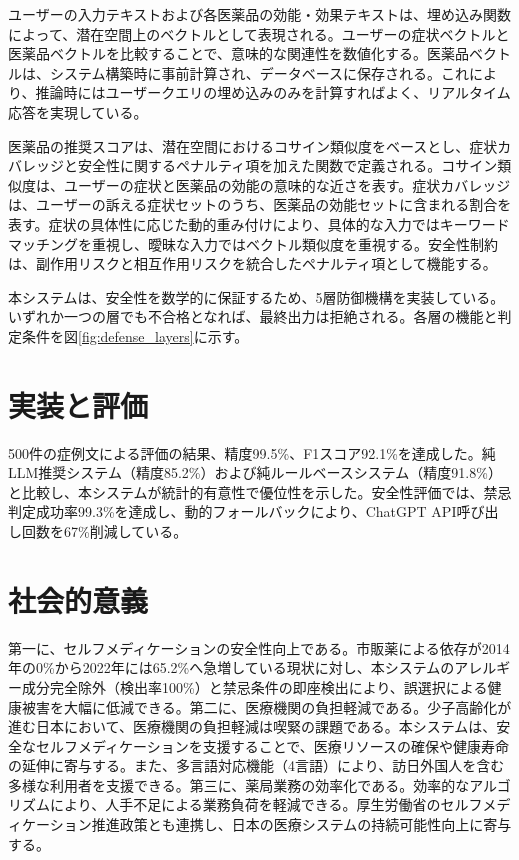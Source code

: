\documentclass[a4paper,11pt]{bxjsarticle}
\theoremstyle{definition}
\begin{document}
ユーザーの入力テキストおよび各医薬品の効能・効果テキストは、埋め込み関数によって、潜在空間上のベクトルとして表現される。ユーザーの症状ベクトルと医薬品ベクトルを比較することで、意味的な関連性を数値化する。医薬品ベクトルは、システム構築時に事前計算され、データベースに保存される。これにより、推論時にはユーザークエリの埋め込みのみを計算すればよく、リアルタイム応答を実現している。

医薬品の推奨スコアは、潜在空間におけるコサイン類似度をベースとし、症状カバレッジと安全性に関するペナルティ項を加えた関数で定義される。コサイン類似度は、ユーザーの症状と医薬品の効能の意味的な近さを表す。症状カバレッジは、ユーザーの訴える症状セットのうち、医薬品の効能セットに含まれる割合を表す。症状の具体性に応じた動的重み付けにより、具体的な入力ではキーワードマッチングを重視し、曖昧な入力ではベクトル類似度を重視する。安全性制約は、副作用リスクと相互作用リスクを統合したペナルティ項として機能する。

本システムは、安全性を数学的に保証するため、5層防御機構を実装している。いずれか一つの層でも不合格となれば、最終出力は拒絶される。各層の機能と判定条件を図\ref{fig:defense_layers}に示す。

\section{実装と評価}

500件の症例文による評価の結果、精度99.5\%、F1スコア92.1\%を達成した。純LLM推奨システム（精度85.2\%）および純ルールベースシステム（精度91.8\%）と比較し、本システムが統計的有意性で優位性を示した。安全性評価では、禁忌判定成功率99.3\%を達成し、動的フォールバックにより、ChatGPT API呼び出し回数を67\%削減している。


\section{社会的意義}

第一に、セルフメディケーションの安全性向上である。市販薬による依存が2014年の0\%から2022年には65.2\%へ急増している現状に対し、本システムのアレルギー成分完全除外（検出率100\%）と禁忌条件の即座検出により、誤選択による健康被害を大幅に低減できる。第二に、医療機関の負担軽減である。少子高齢化が進む日本において、医療機関の負担軽減は喫緊の課題である。本システムは、安全なセルフメディケーションを支援することで、医療リソースの確保や健康寿命の延伸に寄与する。また、多言語対応機能（4言語）により、訪日外国人を含む多様な利用者を支援できる。第三に、薬局業務の効率化である。効率的なアルゴリズムにより、人手不足による業務負荷を軽減できる。厚生労働省のセルフメディケーション推進政策とも連携し、日本の医療システムの持続可能性向上に寄与する。
\end{document}
